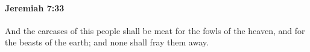 
		\paragraph{Jeremiah 7:33} %
			\label{JEREMIAH-7-33}

			And the carcases of this people shall be meat for the fowls of the heaven, and for the beasts of the earth; and none shall fray them away.


